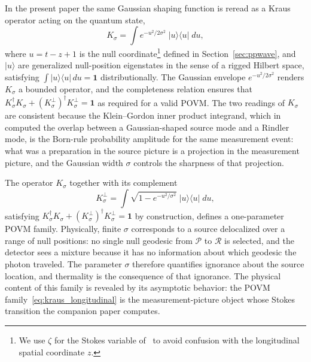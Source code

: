 \documentclass[12pt,a4paper]{article}
\begin{document}
In the present paper the same Gaussian shaping function is reread as a Kraus operator 
acting on the quantum state,
\begin{equation}
  K_\sigma = \int e^{-u^2/2\sigma^2}\;
|u\rangle\langle u|\; du,
\label{eq:kraus_longitudinal}
\end{equation}
where $u = t - z + 1$ is the null coordinate\footnote{We use $\zeta$ for the Stokes variable 
of~\cite{player2025driving} to avoid confusion 
with the longitudinal spatial coordinate $z$.}
defined in Section~\ref{sec:ppwave}, and $|u\rangle$ are generalized null-position 
eigenstates in the sense of a rigged Hilbert space, satisfying 
$\int |u\rangle\langle u|\, du = \mathbf{1}$ distributionally. The Gaussian envelope 
$e^{-u^2/2\sigma^2}$ renders $K_\sigma$ a bounded operator, and the completeness 
relation ensures that $K_\sigma^\dagger K_\sigma + 
(K_\sigma^\perp)^\dagger K_\sigma^\perp = \mathbf{1}$ as required for a valid POVM.
The two readings of $K_\sigma$ are consistent because the Klein--Gordon 
inner product integrand, which in~\cite{player2025driving} computed the overlap between 
a Gaussian-shaped source mode and a Rindler mode, is the Born-rule probability 
amplitude for the same measurement event: what was a preparation in the source picture 
is a projection in the measurement picture, and the Gaussian width $\sigma$ controls 
the sharpness of that projection.

The operator $K_\sigma$ together with its complement 
\begin{equation}
K_\sigma^\perp = \int \sqrt{1 - e^{-u^2/\sigma^2}}\;
|u\rangle\langle u|\; du,
\end{equation}
satisfying 
$K_\sigma^\dagger K_\sigma + 
(K_\sigma^\perp)^\dagger K_\sigma^\perp = \mathbf{1}$ 
by construction, defines a one-parameter POVM family.
Physically, finite $\sigma$ corresponds to a source delocalized 
over a range of null positions: no single null geodesic from 
$\mathcal{P}$ to $\mathcal{R}$ is selected, and the detector 
sees a mixture because it has no information about which geodesic 
the photon traveled. The parameter $\sigma$ therefore quantifies 
ignorance about the source location, and thermality is the 
consequence of that ignorance.
The physical content of this family is revealed by its asymptotic 
behavior: the POVM family~\eqref{eq:kraus_longitudinal} is the 
measurement-picture object whose Stokes transition the companion 
paper computes.
\end{document}
